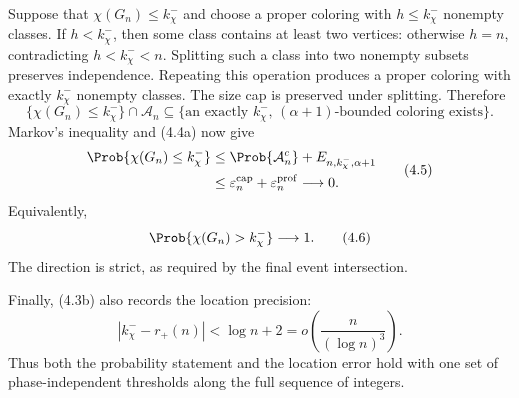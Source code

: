 Suppose that $\chi(G_n)\le k_\chi^-$ and choose a proper coloring with
$h\le k_\chi^-$ nonempty classes. If $h<k_\chi^-$, then some class contains at
least two vertices: otherwise $h=n$, contradicting $h<k_\chi^-<n$. Splitting
such a class into two nonempty subsets preserves independence. Repeating this
operation produces a proper coloring with exactly $k_\chi^-$ nonempty classes.
The size cap is preserved under splitting. Therefore
\[
  \{\chi(G_n)\le k_\chi^-\}\cap\mathcal A_n
  \subseteq
  \{\text{an exactly $k_\chi^-$, $(\alpha+1)$-bounded coloring exists}\}.
\]
Markov's inequality and (4.4a) now give
\begin{equation*}
\begin{aligned}
  \Prob{\chi(G_n)\le k_\chi^-}
  &\le
  \Prob{\mathcal A_n^c}
  +E_{n,k_\chi^-,\alpha+1}\\
  &\le
  \varepsilon_n^{\mathrm{cap}}
  +\varepsilon_n^{\mathrm{prof}}
  \longrightarrow0.
\end{aligned}
  \tag{4.5}
\end{equation*}
Equivalently,
\begin{equation*}
  \Prob{\chi(G_n)>k_\chi^-}\longrightarrow1.
  \tag{4.6}
\end{equation*}
The direction is strict, as required by the final event intersection.

Finally, (4.3b) also records the location precision:
\begin{equation*}
  |k_\chi^--r_+(n)|
  <\log n+2
  =o\!\left(\frac{n}{(\log n)^3}\right).
  \tag{4.7}
\end{equation*}
Thus both the probability statement and the location error hold with one set
of phase-independent thresholds along the full sequence of integers.
